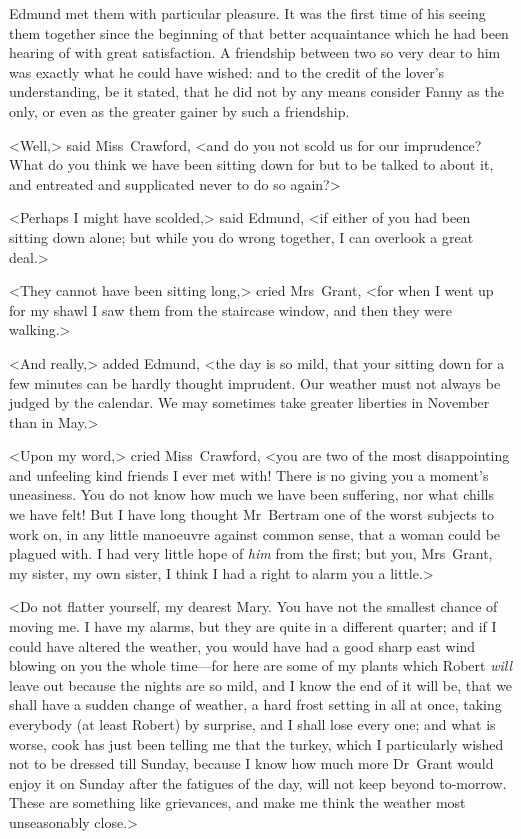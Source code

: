 Edmund met them with particular pleasure. It was the first time of his seeing them together since the beginning of that better acquaintance which he had been hearing of with great satisfaction. A friendship between two so very dear to him was exactly what he could have wished: and to the credit of the lover's understanding, be it stated, that he did not by any means consider Fanny as the only, or even as the greater gainer by such a friendship.

<Well,> said Miss~Crawford, <and do you not scold us for our imprudence? What do you think we have been sitting down for but to be talked to about it, and entreated and supplicated never to do so again?>

<Perhaps I might have scolded,> said Edmund, <if either of you had been sitting down alone; but while you do wrong together, I can overlook a great deal.>

<They cannot have been sitting long,> cried Mrs~Grant, <for when I went up for my shawl I saw them from the staircase window, and then they were walking.>

<And really,> added Edmund, <the day is so mild, that your sitting down for a few minutes can be hardly thought imprudent. Our weather must not always be judged by the calendar. We may sometimes take greater liberties in November than in May.>

<Upon my word,> cried Miss~Crawford, <you are two of the most disappointing and unfeeling kind friends I ever met with! There is no giving you a moment's uneasiness. You do not know how much we have been suffering, nor what chills we have felt! But I have long thought Mr~Bertram one of the worst subjects to work on, in any little manoeuvre against common sense, that a woman could be plagued with. I had very little hope of \textit{him}  from the first; but you, Mrs~Grant, my sister, my own sister, I think I had a right to alarm you a little.>

<Do not flatter yourself, my dearest Mary. You have not the smallest chance of moving me. I have my alarms, but they are quite in a different quarter; and if I could have altered the weather, you would have had a good sharp east wind blowing on you the whole time—for here are some of my plants which Robert \textit{will}  leave out because the nights are so mild, and I know the end of it will be, that we shall have a sudden change of weather, a hard frost setting in all at once, taking everybody (at least Robert) by surprise, and I shall lose every one; and what is worse, cook has just been telling me that the turkey, which I particularly wished not to be dressed till Sunday, because I know how much more Dr~Grant would enjoy it on Sunday after the fatigues of the day, will not keep beyond to-morrow. These are something like grievances, and make me think the weather most unseasonably close.>

